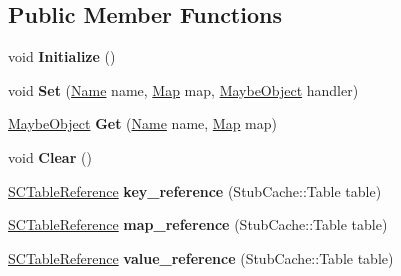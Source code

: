 \subsection*{Public Member Functions}
\begin{DoxyCompactItemize}
\item 
\mbox{\label{classv8_1_1internal_1_1StubCache_a1d7461d9541a76fea7335451d844449b}} 
void {\bfseries Initialize} ()
\item 
\mbox{\label{classv8_1_1internal_1_1StubCache_a35d25392fec742f59661f67686e088b2}} 
void {\bfseries Set} (\mbox{\hyperlink{classv8_1_1internal_1_1Name}{Name}} name, \mbox{\hyperlink{classv8_1_1internal_1_1Map}{Map}} map, \mbox{\hyperlink{classv8_1_1internal_1_1MaybeObject}{Maybe\+Object}} handler)
\item 
\mbox{\label{classv8_1_1internal_1_1StubCache_ab80ad2e45f300947de004c306949e624}} 
\mbox{\hyperlink{classv8_1_1internal_1_1MaybeObject}{Maybe\+Object}} {\bfseries Get} (\mbox{\hyperlink{classv8_1_1internal_1_1Name}{Name}} name, \mbox{\hyperlink{classv8_1_1internal_1_1Map}{Map}} map)
\item 
\mbox{\label{classv8_1_1internal_1_1StubCache_ab9c691287872be2c5d6dacb76b7635b4}} 
void {\bfseries Clear} ()
\item 
\mbox{\label{classv8_1_1internal_1_1StubCache_a575962f2abed80344525523caea0f6ff}} 
\mbox{\hyperlink{classv8_1_1internal_1_1SCTableReference}{S\+C\+Table\+Reference}} {\bfseries key\+\_\+reference} (Stub\+Cache\+::\+Table table)
\item 
\mbox{\label{classv8_1_1internal_1_1StubCache_a5fafa8f381e563ececf1822dc4115660}} 
\mbox{\hyperlink{classv8_1_1internal_1_1SCTableReference}{S\+C\+Table\+Reference}} {\bfseries map\+\_\+reference} (Stub\+Cache\+::\+Table table)
\item 
\mbox{\label{classv8_1_1internal_1_1StubCache_a24b58a5748ec9e5daddb55777e945319}} 
\mbox{\hyperlink{classv8_1_1internal_1_1SCTableReference}{S\+C\+Table\+Reference}} {\bfseries value\+\_\+reference} (Stub\+Cache\+::\+Table table)

\end{DoxyCompactItemize}
